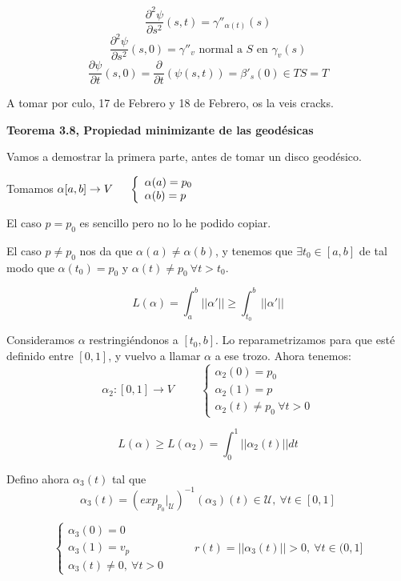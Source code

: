 \documentclass[openany]{book}
\begin{document}
\begin{demonstration}
  $$ \dfrac{\partial ^2 \psi}{\partial s^2}(s,t) = \gamma ''_{\alpha (t)}(s)  $$
  $$ \dfrac{\partial ^2 \psi}{\partial s^2}(s,0) = \gamma ''_v \text{ normal a }S \text{ en } \gamma _v(s) $$
  $$ \dfrac{\partial \psi}{\partial t}(s,0) = \dfrac{\partial }{\partial t}\left( \psi(s,t) \right) = \beta '_s(0) \in TS=T   $$

  A tomar por culo, 17 de Febrero y 18 de Febrero, os la veis cracks.
\end{demonstration}

\begin{center}
\textbf{Teorema 3.8, Propiedad minimizante de las geodésicas}
\end{center}
Vamos a demostrar la primera parte, antes de tomar un disco geodésico.
\begin{demonstration}
  Tomamos $ \alpha [a,b] \to V \hspace{0.5cm} \left\{ \begin{array}{l}
    \alpha (a)=p_0\\
    \alpha (b)=p
  \end{array} \right. $

  El caso $p=p_0$ es sencillo pero no lo he podido copiar.

  El caso $p \ne p_0$ nos da que $\alpha (a) \ne \alpha (b)$, y tenemos que $\exists t_0 \in [a,b]$ de tal modo que $\alpha (t_0) = p_0$ y $\alpha (t) \ne p_0\ \forall t>t_0$.

  $$ L(\alpha )= \int_{a}^{b}||\alpha '|| \geq \int_{t_0}^{b}||\alpha '|| $$

  Consideramos $\alpha $ restringiéndonos a $[t_0,b]$. Lo reparametrizamos para que esté definido entre $[0,1]$, y vuelvo a llamar $\alpha $ a ese trozo. Ahora tenemos:
  $$ \alpha_2 :[0,1] \to V \hspace{1cm} \left\{ \begin{array}{l}
    \alpha_2 (0) = p_0\\
    \alpha_2 (1) = p\\
    \alpha_2 (t) \ne p_0\ \forall t > 0
  \end{array} \right. $$

  $$ L(\alpha ) \geq L(\alpha _2) = \int_{0}^{1}||\alpha _2(t)||dt $$

  Defino ahora $\alpha _3(t)$ tal que
  $$ \alpha _3(t) = (exp_{p_0}|_ \mathcal{U})^{-1} (\alpha _3)(t) \in \mathcal{U} , \ \forall t \in [0,1] $$

  $$ \left\{ \begin{array}{l}
    \alpha _3(0) = 0\\
    \alpha _3(1) = v_p\\
    \alpha _3(t) \ne 0 , \ \forall t > 0
  \end{array} \right.  \hspace{1cm} r(t) = ||\alpha _3(t)||>0 , \ \forall t \in (0,1]$$


\end{demonstration}
\end{document}
